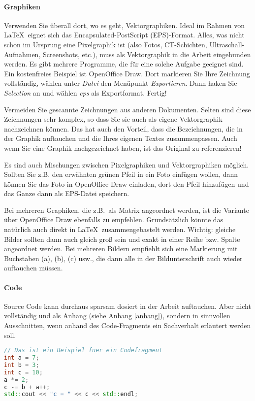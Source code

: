 {\paragraph{Graphiken}
Verwenden Sie überall dort, wo es geht, Vektorgraphiken. Ideal im Rahmen von \LaTeX~eignet sich das Encapsulated-PostScript (EPS)-Format.
Alles, was nicht schon im Ursprung eine Pixelgraphik ist (also Fotos, CT-Schichten, Ultraschall-Aufnahmen, Screenshots, etc.), muss als Vektorgraphik in die Arbeit eingebunden werden.
Es gibt mehrere Programme, die für eine solche Aufgabe geeignet sind. Ein kostenfreies Beispiel ist OpenOffice Draw.
Dort markieren Sie Ihre Zeichnung vollständig, wählen unter \emph{Datei} den Menüpunkt \emph{Exportieren}.
Dann haken Sie \emph{Selection} an und wählen \emph{eps} als Exportformat.
Fertig!

Vermeiden Sie gescannte Zeichnungen aus anderen Dokumenten.
Selten sind diese Zeichnungen sehr komplex, so dass Sie sie auch als eigene Vektorgraphik nachzeichnen können.
Das hat auch den Vorteil, dass die Bezeichnungen, die in der Graphik auftauchen und die Ihres eigenen Textes zusammenpassen.
Auch wenn Sie eine Graphik nachgezeichnet haben, ist das Original zu referenzieren!

Es sind auch Mischungen zwischen Pixelgraphiken und Vektorgraphiken möglich.
Sollten Sie z.B. den erwähnten grünen Pfeil in ein Foto einfügen wollen, dann können Sie das Foto in OpenOffice Draw einladen, dort den Pfeil hinzufügen und das Ganze dann als EPS-Datei speichern.

Bei mehreren Graphiken, die z.B.~als Matrix angeordnet werden, ist die Variante über OpenOffice Draw ebenfalls zu empfehlen.
Grundsätzlich könnte das natürlich auch direkt in \LaTeX~zusammengebastelt werden.
Wichtig: gleiche Bilder sollten dann auch gleich groß sein und exakt in einer Reihe bzw. Spalte angeordnet werden.
Bei mehreren Bildern empfiehlt sich eine Markierung mit Buchstaben (a), (b), (c) usw., die dann alle in der Bildunterschrift auch wieder auftauchen müssen.

\paragraph{Code}
Source Code kann durchaus sparsam dosiert in der Arbeit auftauchen.
Aber nicht vollständig und als Anhang (siehe Anhang \ref{anhang}), sondern in sinnvollen Ausschnitten, wenn anhand des Code-Fragments ein Sachverhalt erläutert werden soll.

\begin{lstlisting}[language=C++, breaklines=true, basicstyle=\small, numbers=none]
// Das ist ein Beispiel fuer ein Codefragment
int a = 7;
int b = 3;
int c = 10;
a *= 2;
c -= b + a++;
std::cout << "c = " << c << std::endl;
\end{lstlisting}

}
